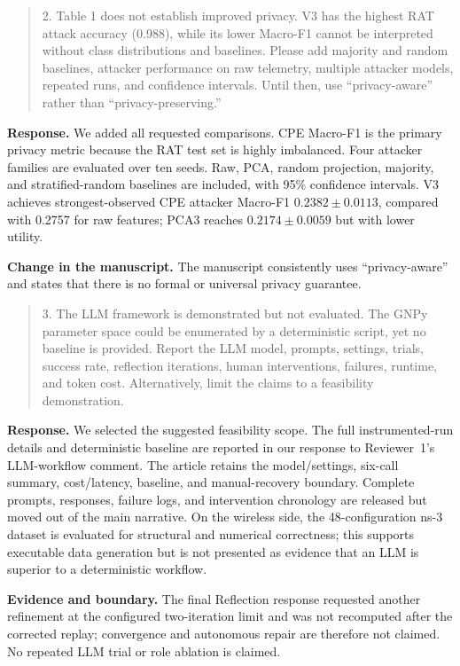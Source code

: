 \documentclass[11pt]{article}
\newenvironment{reviewercomment}{\begin{quote}\color{reviewblue}}{\end{quote}}
\newenvironment{authorresponse}{\color{responsegreen}\textbf{Response.} }{\par\color{black}}
\newcommand{\change}[1]{\par\textbf{Change in the manuscript.} #1\par}
\newcommand{\evidence}[1]{\par\textbf{Evidence and boundary.} #1\par}
\begin{document}
\begin{reviewercomment}
2. Table 1 does not establish improved privacy. V3 has the highest RAT attack accuracy (0.988), while its lower Macro-F1 cannot be interpreted without class distributions and baselines. Please add majority and random baselines, attacker performance on raw telemetry, multiple attacker models, repeated runs, and confidence intervals. Until then, use ``privacy-aware'' rather than ``privacy-preserving.''
\end{reviewercomment}
\begin{authorresponse}
We added all requested comparisons. CPE Macro-F1 is the primary privacy metric because the RAT test set is highly imbalanced. Four attacker families are evaluated over ten seeds. Raw, PCA, random projection, majority, and stratified-random baselines are included, with 95\% confidence intervals. V3 achieves strongest-observed CPE attacker Macro-F1 $0.2382\pm0.0113$, compared with 0.2757 for raw features; PCA3 reaches $0.2174\pm0.0059$ but with lower utility.
\end{authorresponse}
\change{The manuscript consistently uses ``privacy-aware'' and states that there is no formal or universal privacy guarantee.}

\begin{reviewercomment}
3. The LLM framework is demonstrated but not evaluated. The GNPy parameter space could be enumerated by a deterministic script, yet no baseline is provided. Report the LLM model, prompts, settings, trials, success rate, reflection iterations, human interventions, failures, runtime, and token cost. Alternatively, limit the claims to a feasibility demonstration.
\end{reviewercomment}
\begin{authorresponse}
We selected the suggested feasibility scope. The full instrumented-run details and deterministic baseline are reported in our response to Reviewer~1's LLM-workflow comment. The article retains the model/settings, six-call summary, cost/latency, baseline, and manual-recovery boundary. Complete prompts, responses, failure logs, and intervention chronology are released but moved out of the main narrative. On the wireless side, the 48-configuration ns-3 dataset is evaluated for structural and numerical correctness; this supports executable data generation but is not presented as evidence that an LLM is superior to a deterministic workflow.
\end{authorresponse}
\evidence{The final Reflection response requested another refinement at the configured two-iteration limit and was not recomputed after the corrected replay; convergence and autonomous repair are therefore not claimed. No repeated LLM trial or role ablation is claimed.}
\end{document}
